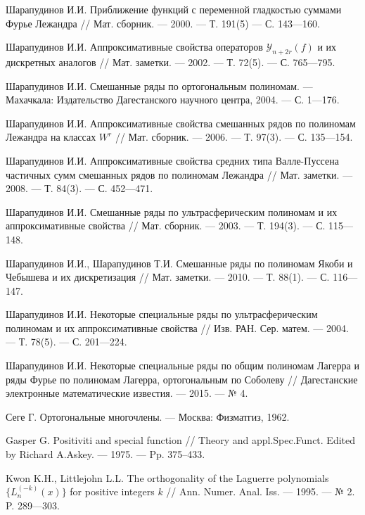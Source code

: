\begin{thebibliography}{111}



{Шарапудинов И.И.} Приближение функций с переменной гладкостью суммами Фурье Лежандра // Мат. сборник. --- 2000. --- Т. 191(5) --- С. 143---160.


{Шарапудинов И.И.} Аппроксимативные свойства операторов $\mathcal{ Y}_{n+2r}(f)$ и их дискретных аналогов // Мат. заметки. --- 2002. --- Т. 72(5). --- С. 765---795.


{Шарапудинов И.И.} Смешанные ряды по ортогональным полиномам. --- Махачкала: Издательство Дагестанского научного центра, 2004. --- С. 1---176.


{Шарапудинов И.И.}
Аппроксимативные свойства смешанных рядов по полиномам Лежандра на классах $W^r$ // Мат. сборник. --- 2006. --- Т. 97(3). --- С. 135---154.


{Шарапудинов И.И.}
Аппроксимативные свойства средних типа Валле-Пуссена частичных сумм смешанных рядов по полиномам Лежандра // Мат. заметки. --- 2008. --- Т. 84(3). --- С. 452---471.


{Шарапудинов И.И.}
 Смешанные ряды по ультрасферическим полиномам и их аппроксимативные свойства
// Мат. сборник. --- 2003. --- Т. 194(3). --- С. 115---148.


{Шарапудинов И.И., Шарапудинов Т.И.}
 Смешанные ряды по полиномам Якоби и Чебышева и их дискретизация
// Мат. заметки. --- 2010. --- Т. 88(1). --- С. 116---147.


{Шарапудинов И.И.}
 Некоторые специальные ряды по ультрасферическим полиномам и их аппроксимативные свойства
// Изв. РАН. Сер. матем. --- 2004. --- Т. 78(5). --- С. 201---224.


{Шарапудинов И.И.}
 Некоторые специальные ряды по общим полиномам Лагерра и ряды Фурье по полиномам Лагерра, ортогональным по Соболеву
// Дагестанские электронные математические известия. --- 2015. --- № 4.


{Сеге Г.} Ортогональные многочлены. --- Москва: Физматгиз, 1962.


{Gasper G.}
 Positiviti and special function
// Theory and appl.Spec.Funct. Edited by Richard A.Askey. --- 1975. --- Pp. 375--433.


{Kwon K.H., Littlejohn L.L.}
 The orthogonality of the Laguerre polynomials $\{L_n^{(-k)}(x)\}$ for positive integers $k$
// Ann. Numer. Anal. Iss. --- 1995. --- № 2. P. 289---303.



\end{thebibliography}
